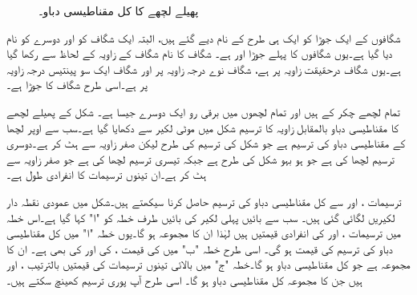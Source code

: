\begin{figure}
\caption{پھیلے لچھے کا کل مقناطیسی دباو۔}
\label{شکل_گھومتے_مشین_پھیلے_لچھے_کی_دباو}
\end{figure}


شگافوں کے ایک جوڑا کو ایک ہی طرح کے نام دیے گئے ہیں، البتہ ایک شگاف کو  اور دوسرے کو  نام دیا گیا ہے۔یوں شگافوں کا پہلے جوڑا   اور   ہے۔ شگاف   کا نام شگاف کے زاویہ کے لحاظ سے رکھا گیا ہے۔یوں  شگاف   درحقیقت  زاویہ پر ہے، شگاف  نوے درجہ زاویہ پر اور شگاف   ایک سو پینتیس درجہ زاویہ پر ہے۔اسی طرح   شگاف  کا جوڑا ہے۔

تمام لچھے  چکر کے ہیں اور تمام لچھوں میں  برقی رو  ایک دوسرے جیسا ہے۔  شکل    کے  پھیلے لچھے کا مقناطیسی دباو بالمقابل زاویہ کا ترسیم شکل   میں موٹی لکیر سے دکھایا گیا ہے۔سب سے اوپر لچھا    کے مقناطیسی دباو کی ترسیم ہے جو  شکل   کی ترسیم کی طرح لیکن صفر زاویہ سے  ہٹ کر ہے۔دوسری ترسیم لچھا  کی ہے جو ہو بہو شکل    کی طرح ہے جبکہ تیسری ترسیم  لچھا  کی ہے جو صفر زاویہ سے  ہٹ کر ہے۔ان تینوں ترسیمات کا انفرادی طول  ہے۔


ترسیمات ،  اور  سے کل مقناطیسی دباو کی ترسیم   حاصل کرنا سیکھتے ہیں۔شکل  میں عمودی نقطہ دار لکیریں لگائی گئی ہیں۔ سب سے بائیں  پہلی لکیر کی بائیں طرف خطہ کو "ا" کہا گیا ہے۔اس خطہ میں ترسیمات ،  اور  کی انفرادی قیمتیں  ہیں لہٰذا ان کا مجموعہ  ہو گا۔یوں خطہ "ا" میں  کل مقناطیسی دباو   کی ترسیم کی قیمت   ہو گی۔ اسی طرح خطہ "ب" میں  کی قیمت  ،  کی  اور  کی بھی  ہے۔ ان کا مجموعہ   ہے جو کل مقناطیسی دباو  ہو گا۔خطہ "ج" میں  بالائی تینوں ترسیمات کی قیمتیں بالترتیب  ،  اور   ہیں جن کا مجموعہ   کل مقناطیسی دباو ہو گا۔ اسی طرح آپ پوری ترسیم کھینچ سکتے ہیں۔


